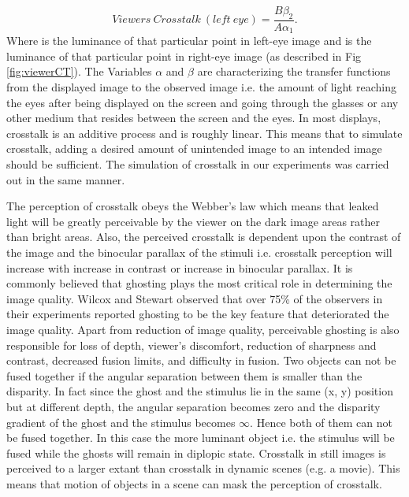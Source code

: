 \begin{equation}
Viewers\ Crosstalk\ (left\ eye) = \frac{B\beta_2}{A\alpha_1}.
\end{equation}
Where  is the luminance of that particular point in left-eye image and  is the luminance of that particular point in right-eye image (as described in Fig \ref{fig:viewerCT}). The Variables \(\alpha\) and \(\beta\) are characterizing the transfer functions from the displayed image to the observed image i.e. the amount of light reaching the eyes after being displayed on the screen and going through the glasses or any other medium that resides between the screen and the eyes. In most displays, crosstalk is an additive process and is roughly linear. This means that to simulate crosstalk, adding a desired amount of unintended image to an intended image should be sufficient. The simulation of crosstalk in our experiments was carried out in the same manner.

The perception of crosstalk obeys the Webber's law which means that leaked light will be greatly perceivable by the viewer on the dark image areas rather than bright areas. Also, the perceived crosstalk is dependent upon the contrast of the image and the binocular parallax of the stimuli i.e. crosstalk perception will increase with increase in contrast or increase in binocular parallax. It is commonly believed that ghosting plays the most critical role in determining the image quality. Wilcox and Stewart \cite{wilcox2003determinants} observed that over 75\% of the observers in their experiments reported ghosting to be the key feature that deteriorated the image quality. Apart from reduction of image quality, perceivable ghosting is also responsible for loss of depth, viewer's discomfort, reduction of sharpness and contrast, decreased fusion limits, and difficulty in fusion. Two objects can not be fused together if the angular separation between them is smaller than the disparity\cite{burt1980disparity}. In fact since the ghost and the stimulus lie in the same (x, y) position but at different depth, the angular separation becomes zero and the disparity gradient of the ghost and the stimulus becomes $\infty$. Hence both of them can not be fused together. In this case the more luminant object i.e. the stimulus will be fused while the ghosts will remain in diplopic state. Crosstalk in still images is perceived to a larger extant than crosstalk in dynamic scenes (e.g. a movie). This means that motion of objects in a scene can mask the perception of crosstalk.

